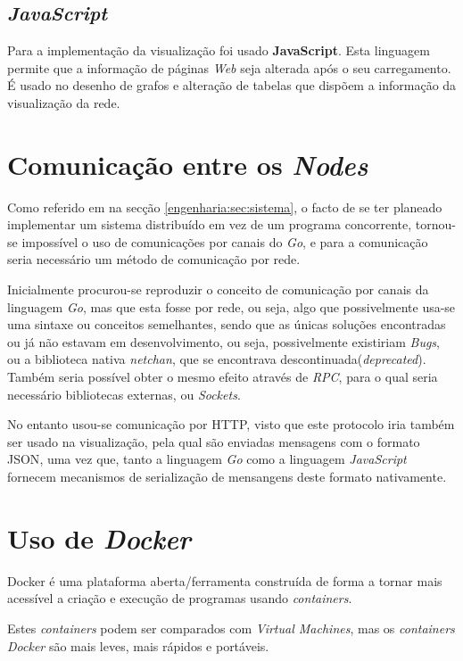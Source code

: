 \subsection*{\emph{JavaScript}}
Para a implementação da visualização foi usado \textbf{JavaScript}.
Esta linguagem permite que a informação de páginas \emph{Web} seja alterada após o seu carregamento.
É usado no desenho de grafos e alteração de tabelas que dispõem a informação da visualização da rede.

\section{Comunicação entre os \emph{Nodes}}
\label{engenharia:sec:comunicação}
Como referido em na secção \ref{engenharia:sec:sistema}, o facto de se ter planeado implementar um sistema distribuído
em vez de um programa concorrente, tornou-se impossível o uso de comunicações por canais do \emph{Go}, 
e para a comunicação seria necessário um método de comunicação por rede.

Inicialmente procurou-se reproduzir o conceito de comunicação por canais da linguagem \emph{Go}, mas que esta fosse por rede, ou seja, algo que possivelmente
usa-se uma sintaxe ou conceitos semelhantes, sendo que as únicas soluções encontradas ou já não estavam em desenvolvimento, ou seja, possivelmente existiriam \emph{Bugs}, 
ou a biblioteca nativa \emph{netchan}, que se encontrava descontinuada(\emph{deprecated}). 
Também seria possível obter o mesmo efeito através de \emph{RPC}, para o qual seria necessário bibliotecas externas, 
ou \emph{Sockets}.

No entanto usou-se comunicação por \acs*{HTTP}, visto que este protocolo iria também ser usado na visualização,
pela qual são enviadas mensagens com o formato \acs*{JSON}, uma vez que, tanto a linguagem \emph{Go} como a linguagem 
\emph{JavaScript} fornecem mecanismos de serialização de mensangens deste formato nativamente.


\section{Uso de \emph{Docker}}
Docker é uma plataforma aberta/ferramenta construída de forma a tornar mais acessível a criação e execução de programas  usando \emph{containers}.

Estes \emph{containers} podem ser comparados com \emph{Virtual Machines}, mas os \emph{containers} \emph{Docker} são mais leves, mais rápidos e portáveis.

